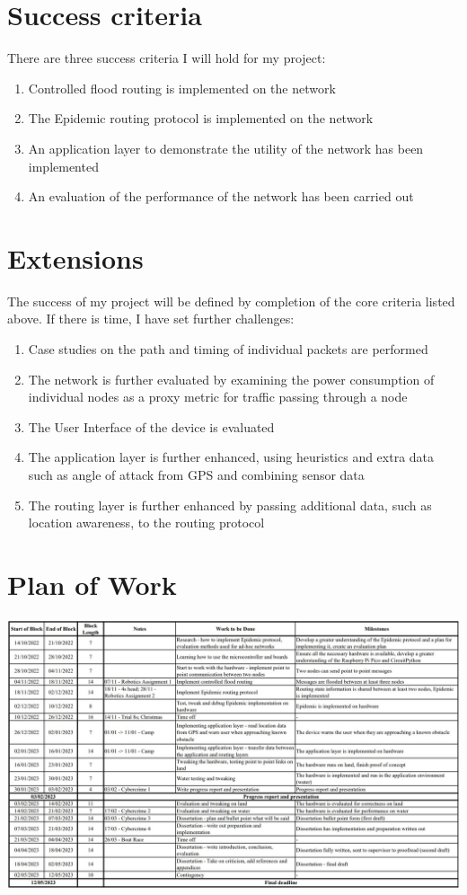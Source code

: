 \documentclass[10pt, a4paper]{article}
\begin{document}
\section*{Success criteria}
There are three success criteria I will hold for my project:
\begin{enumerate}
\item Controlled flood routing is implemented on the network
\item The Epidemic routing protocol is implemented on the network 
\item An application layer to demonstrate the utility of the network has been implemented
\item An evaluation of the performance of the network has been carried out
\end{enumerate}

\section*{Extensions}
The success of my project will be defined by completion of the core criteria listed above. If there is time, I have set further challenges:
\begin{enumerate}
\item Case studies on the path and timing of individual packets are performed
\item The network is further evaluated by examining the power consumption of individual nodes as a proxy metric for traffic passing through a node
\item The User Interface of the device is evaluated
\item The application layer is further enhanced, using heuristics and extra data such as angle of attack from GPS and combining sensor data
\item The routing layer is further enhanced by passing additional data, such as location awareness, to the routing protocol
\end{enumerate}

\section*{Plan of Work}
\includegraphics[width=\textwidth]{Plan.jpg}
\end{document}
